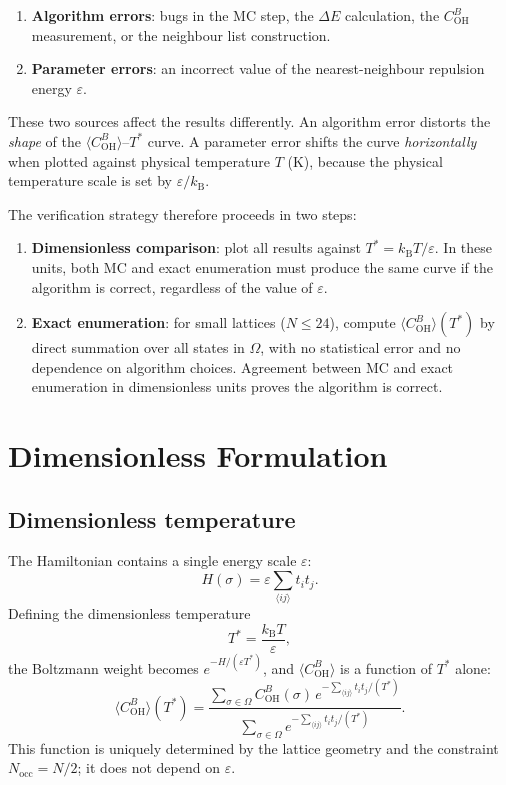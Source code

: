 \documentclass[12pt, a4paper]{article}
\theoremstyle{plain}
\theoremstyle{definition}
\newcommand{\COH}{C_\mathrm{OH}^B}
\newcommand{\eps}{\varepsilon}
\newcommand{\kB}{k_{\mathrm{B}}}
\newcommand{\Nocc}{N_\mathrm{occ}}
\newcommand{\Tstar}{T^*}
\newcommand{\avgE}[1]{\langle #1 \rangle}
\begin{document}
\begin{enumerate}
    \item \textbf{Algorithm errors}: bugs in the MC step, the
          $\Delta E$ calculation, the $\COH$ measurement, or the
          neighbour list construction.
    \item \textbf{Parameter errors}: an incorrect value of the
          nearest-neighbour repulsion energy $\eps$.
\end{enumerate}

These two sources affect the results differently.
An algorithm error distorts the \emph{shape} of the
$\avgE{\COH}$--$\Tstar$ curve.
A parameter error shifts the curve \emph{horizontally} when
plotted against physical temperature $T$ (K), because the
physical temperature scale is set by $\eps/\kB$.

The verification strategy therefore proceeds in two steps:

\begin{enumerate}
    \item \textbf{Dimensionless comparison}: plot all results
          against $\Tstar = \kB T/\eps$.
          In these units, both MC and exact enumeration must
          produce the same curve if the algorithm is correct,
          regardless of the value of $\eps$.
    \item \textbf{Exact enumeration}: for small lattices
          ($N \leq 24$), compute $\avgE{\COH}(\Tstar)$ by direct
          summation over all states in $\Omega$, with no
          statistical error and no dependence on algorithm choices.
          Agreement between MC and exact enumeration in dimensionless
          units proves the algorithm is correct.
\end{enumerate}

\section{Dimensionless Formulation}

\subsection{Dimensionless temperature}

The Hamiltonian contains a single energy scale $\eps$:
\[
    H(\sigma) = \eps \sum_{\langle ij \rangle} t_i t_j.
\]
Defining the dimensionless temperature
\[
    \Tstar = \frac{\kB T}{\eps},
\]
the Boltzmann weight becomes $e^{-H/(\eps \Tstar)}$, and
$\avgE{\COH}$ is a function of $\Tstar$ alone:
\[
    \avgE{\COH}(\Tstar) =
    \frac{\displaystyle\sum_{\sigma\in\Omega}
          \COH(\sigma)\,e^{-\sum_{\langle ij \rangle} t_i t_j/(\Tstar)}}
         {\displaystyle\sum_{\sigma\in\Omega}
          e^{-\sum_{\langle ij \rangle} t_i t_j/(\Tstar)}}.
\]
This function is uniquely determined by the lattice geometry
and the constraint $\Nocc = N/2$; it does not depend on $\eps$.
\end{document}
